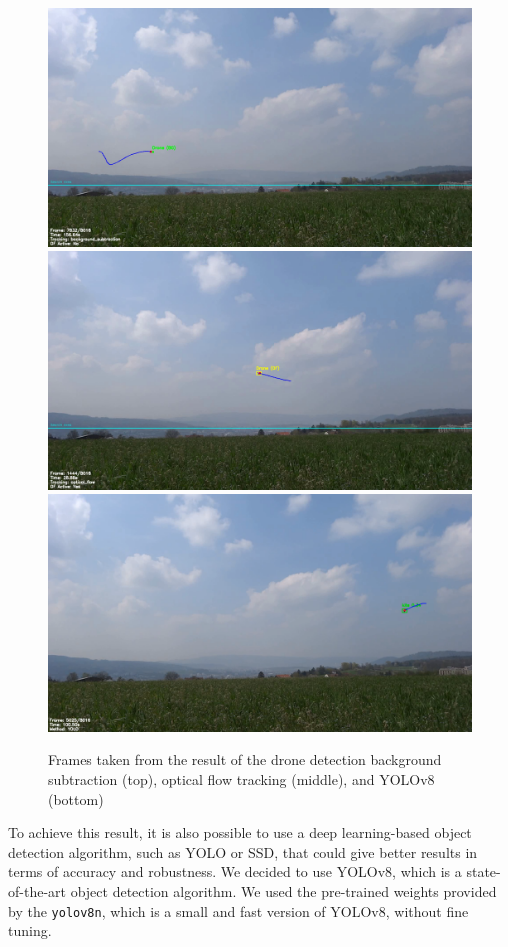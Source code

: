 \documentclass[11pt]{article}
\begin{document}
\begin{figure}[H]
    \centering
    \includegraphics[width=.75\textwidth]{imgs/drone_detection_bs.png}
    \includegraphics[width=.75\textwidth]{imgs/drone_detection_of.png}
    \includegraphics[width=.75\textwidth]{imgs/drone_detection_yolo.png}
    \caption{Frames taken from the result of the drone detection background subtraction (top), optical flow tracking (middle), and YOLOv8 (bottom)}
    \label{fig:drone_detection}
\end{figure}

To achieve this result, it is also possible to use a deep learning-based object detection algorithm, such as YOLO or SSD, that could give better results in terms of accuracy and robustness. We decided to use YOLOv8, which is a state-of-the-art object detection algorithm. We used the pre-trained weights provided by the \texttt{yolov8n}, which is a small and fast version of YOLOv8, without fine tuning.
\end{document}
